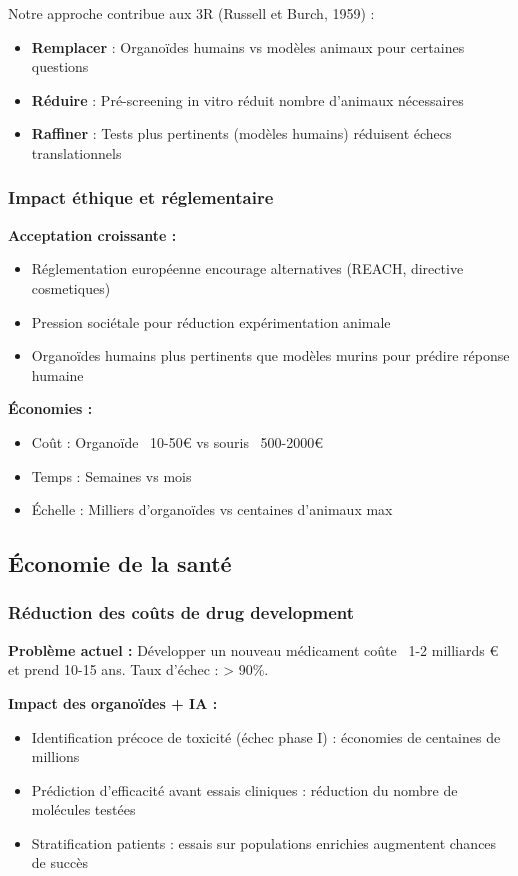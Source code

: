Notre approche contribue aux 3R (Russell et Burch, 1959) :
\begin{itemize}
    \item \textbf{Remplacer} : Organoïdes humains vs modèles animaux pour certaines questions
    \item \textbf{Réduire} : Pré-screening in vitro réduit nombre d'animaux nécessaires
    \item \textbf{Raffiner} : Tests plus pertinents (modèles humains) réduisent échecs translationnels
\end{itemize}

\subsubsection{Impact éthique et réglementaire}

\textbf{Acceptation croissante :}
\begin{itemize}
    \item Réglementation européenne encourage alternatives (REACH, directive cosmetiques)
    \item Pression sociétale pour réduction expérimentation animale
    \item Organoïdes humains plus pertinents que modèles murins pour prédire réponse humaine
\end{itemize}

\textbf{Économies :}
\begin{itemize}
    \item Coût : Organoïde ~10-50€ vs souris ~500-2000€
    \item Temps : Semaines vs mois
    \item Échelle : Milliers d'organoïdes vs centaines d'animaux max
\end{itemize}

\subsection{Économie de la santé}

\subsubsection{Réduction des coûts de drug development}

\textbf{Problème actuel :}
Développer un nouveau médicament coûte ~1-2 milliards € et prend 10-15 ans. Taux d'échec : > 90\%.

\textbf{Impact des organoïdes + IA :}
\begin{itemize}
    \item Identification précoce de toxicité (échec phase I) : économies de centaines de millions
    \item Prédiction d'efficacité avant essais cliniques : réduction du nombre de molécules testées
    \item Stratification patients : essais sur populations enrichies augmentent chances de succès
\end{itemize}

